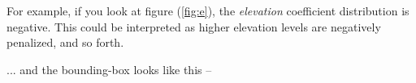 \documentclass[10pt]{article}
\begin{document}
For example, if you look at figure (\ref{fig:e}), the \emph{elevation} coefficient distribution is negative. This could be interpreted as higher elevation levels are negatively penalized, and so forth.
%
\begin{figure}[H]
	\centering
\end{figure}
%
... and the bounding-box looks like this --
\begin{figure}[H]
	\centering
\end{figure}
\end{document}
